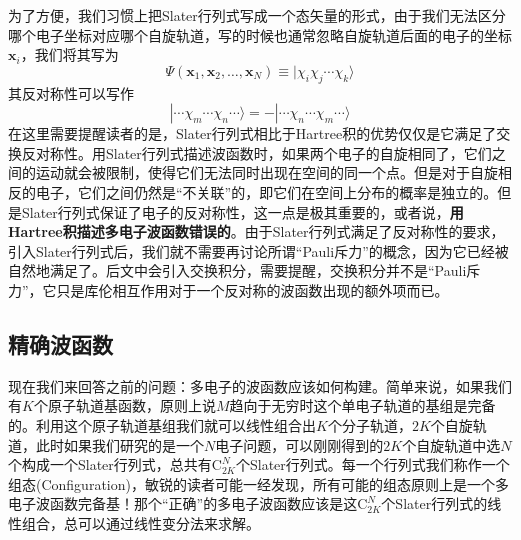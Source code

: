 \documentclass[12pt,a4paper,openany,twoside]{book}
\numberwithin{equation}{section}
\begin{document}
          为了方便，我们习惯上把Slater行列式写成一个态矢量的形式，由于我们无法区分哪个电子坐标对应哪个自旋轨道，写的时候也通常忽略自旋轨道后面的电子的坐标$\mathbf{x}_i$，我们将其写为
          \begin{equation}
            \Psi\left(\mathbf{x}_{1}, \mathbf{x}_{2}, \ldots, \mathbf{x}_{N}\right)\equiv| \chi_{i} \chi_{j} \cdots \chi_{k} \rangle
            \label{short Slater}
          \end{equation}
          其反对称性可以写作
          \begin{equation}
            | \cdots \chi_{m} \cdots \chi_{n} \cdots \rangle=-| \cdots \chi_{n} \cdots \chi_{m} \cdots \rangle
            \label{Slater anti-symm}
          \end{equation}
          在这里需要提醒读者的是，Slater行列式相比于Hartree积的优势仅仅是它满足了交换反对称性。用Slater行列式描述波函数时，如果两个电子的自旋相同了，它们之间的运动就会被限制，使得它们无法同时出现在空间的同一个点。但是对于自旋相反的电子，它们之间仍然是“不关联”的，即它们在空间上分布的概率是独立的。但是Slater行列式保证了电子的反对称性，这一点是极其重要的，或者说，\textbf{用Hartree积描述多电子波函数错误的}。由于Slater行列式满足了反对称性的要求，引入Slater行列式后，我们就不需要再讨论所谓“Pauli斥力”的概念，因为它已经被自然地满足了。后文中会引入交换积分，需要提醒，交换积分并不是“Pauli斥力”，它只是库伦相互作用对于一个反对称的波函数出现的额外项而已。

        \subsection{精确波函数}
          现在我们来回答之前的问题：多电子的波函数应该如何构建。简单来说，如果我们有$K$个原子轨道基函数，原则上说$M$趋向于无穷时这个单电子轨道的基组是完备的。利用这个原子轨道基组我们就可以线性组合出$K$个分子轨道，$2K$个自旋轨道，此时如果我们研究的是一个$N$电子问题，可以刚刚得到的$2K$个自旋轨道中选$N$个构成一个Slater行列式，总共有$\mathrm{C}_{2K}^N$个Slater行列式。每一个行列式我们称作一个组态(Configuration)，敏锐的读者可能一经发现，所有可能的组态原则上是一个多电子波函数完备基！那个“正确”的多电子波函数应该是这$\mathrm{C}_{2K}^N$个Slater行列式的线性组合，总可以通过线性变分法来求解。
\end{document}
